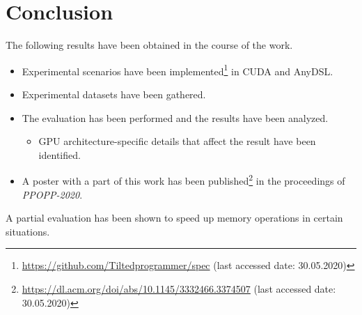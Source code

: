 \section*{Conclusion}

The following results have been obtained in the course of the work.
\begin{itemize}
    \item Experimental scenarios have been implemented\footnote{\url{https://github.com/Tiltedprogrammer/spec} (last accessed date: 30.05.2020)} in CUDA and AnyDSL.
    \item Experimental datasets have been gathered.
    \item The evaluation has been performed and the results have been analyzed.
    \begin{itemize}
        \item GPU architecture-specific details that affect the result have been identified.
    \end{itemize}
    \item A poster with a part of this work has been published\footnote{\url{https://dl.acm.org/doi/abs/10.1145/3332466.3374507} (last accessed date: 30.05.2020)} in the proceedings of \emph{PPOPP-2020}.
\end{itemize}

A partial evaluation has been shown to speed up memory operations in certain situations.